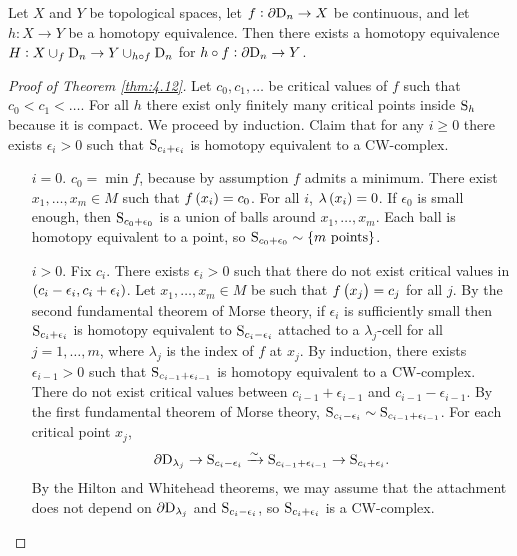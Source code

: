 \begin{theorem}[Hilton]
Let $ X $ and $ Y $ be topological spaces, let $ f : \da\D_n \to X $ be continuous, and let $ h : X \to Y $ be a homotopy equivalence. Then there exists a homotopy equivalence $ H : X \cup_f \D_n \to Y \cup_{h \circ f} \D_n $ for $ h \circ f : \da\D_n \to Y $.
\end{theorem}

\begin{proof}[Proof of Theorem \ref{thm:4.12}]
Let $ c_0, c_1, \dots $ be critical values of $ f $ such that $ c_0 < c_1 < \dots $. For all $ h $ there exist only finitely many critical points inside $ \S_h $ because it is compact. We proceed by induction. Claim that for any $ i \ge 0 $ there exists $ \epsilon_i > 0 $ such that $ \S_{c_i + \epsilon_i} $ is homotopy equivalent to a CW-complex.
\begin{itemize}[leftmargin=0.5in]
\item[$ i = 0 $.] $ c_0 = \min f $, because by assumption $ f $ admits a minimum. There exist $ x_1, \dots, x_m \in M $ such that $ f\br{x_i} = c_0 $. For all $ i $, $ \lambda\br{x_i} = 0 $. If $ \epsilon_0 $ is small enough, then $ \S_{c_0 + \epsilon_0} $ is a union of balls around $ x_1, \dots, x_m $. Each ball is homotopy equivalent to a point, so $ \S_{c_0 + \epsilon_0} \sim \cbr{m \ \text{points}} $.
\item[$ i > 0 $.] Fix $ c_i $. There exists $ \epsilon_i > 0 $ such that there do not exist critical values in $ \br{c_i - \epsilon_i, c_i + \epsilon_i} $. Let $ x_1, \dots, x_m \in M $ be such that $ f\br{x_j} = c_j $ for all $ j $. By the second fundamental theorem of Morse theory, if $ \epsilon_i $ is sufficiently small then $ \S_{c_i + \epsilon_i} $ is homotopy equivalent to $ \S_{c_i - \epsilon_i} $ attached to a $ \lambda_j $-cell for all $ j = 1, \dots, m $, where $ \lambda_j $ is the index of $ f $ at $ x_j $. By induction, there exists $ \epsilon_{i - 1} > 0 $ such that $ \S_{c_{i - 1} + \epsilon_{i - 1}} $ is homotopy equivalent to a CW-complex. There do not exist critical values between $ c_{i - 1} + \epsilon_{i - 1} $ and $ c_{i - 1} - \epsilon_{i - 1} $. By the first fundamental theorem of Morse theory, $ \S_{c_i - \epsilon_i} \sim \S_{c_{i - 1} + \epsilon_{i - 1}} $. For each critical point $ x_j $,
$$ \da\D_{\lambda_j} \to \S_{c_i - \epsilon_i} \xrightarrow{\sim} \S_{c_{i - 1} + \epsilon_{i - 1}} \to \S_{c_i + \epsilon_i}. $$
By the Hilton and Whitehead theorems, we may assume that the attachment does not depend on $ \da\D_{\lambda_j} $ and $ \S_{c_i - \epsilon_i} $, so $ \S_{c_i + \epsilon_i} $ is a CW-complex.
\end{itemize}
\end{proof}

